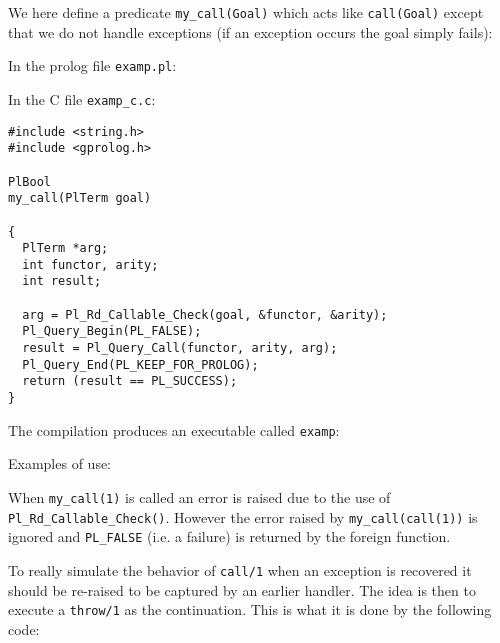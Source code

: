 We here define a predicate \texttt{my\_call(Goal)} which acts like
\texttt{call(Goal)} except that we do not handle exceptions (if an exception
occurs the goal simply fails):

In the prolog file \texttt{examp.pl}:


In the C file \texttt{examp\_c.c}:

\begin{Indentation}
\begin{verbatim}
#include <string.h>
#include <gprolog.h>

PlBool
my_call(PlTerm goal)

{
  PlTerm *arg;
  int functor, arity;
  int result;

  arg = Pl_Rd_Callable_Check(goal, &functor, &arity);
  Pl_Query_Begin(PL_FALSE);
  result = Pl_Query_Call(functor, arity, arg);
  Pl_Query_End(PL_KEEP_FOR_PROLOG);
  return (result == PL_SUCCESS);
}
\end{verbatim}
\end{Indentation}

The compilation produces an executable called \texttt{examp}:


Examples of use:

\begin{CodeTwoCols}
\SkipLine
{}
\SkipLine
{}
\SkipLine
{}
\SkipLine
{}
\SkipLine
{}
\SkipLine
{}
\SkipLine
{}
\end{CodeTwoCols}

When \texttt{my\_call(1)} is called an error is raised due to the use of
\texttt{Pl\_Rd\_Callable\_Check()}. However the error raised by
\texttt{my\_call(call(1))} is ignored and \texttt{PL\_FALSE} (i.e. a failure) is
returned by the foreign function.

To really simulate the behavior of \texttt{call/1} when an exception
is recovered it should be re-raised to be captured by an earlier
handler. The idea is then to execute a \texttt{throw/1} as the
continuation. This is what it is done by the following code:

